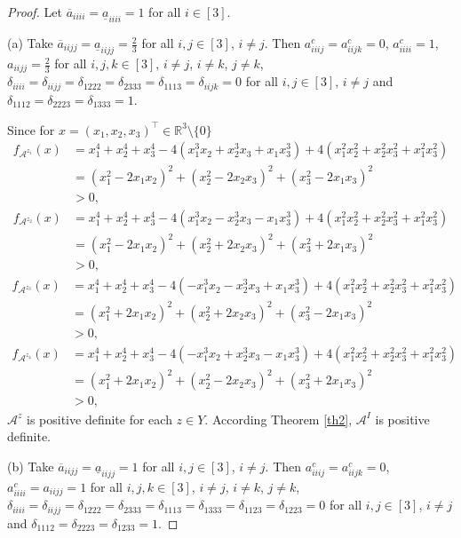 \documentclass[10pt,a4paper]{amsart}
\begin{document}
\begin{proof}
Let $\overline{a}_{iiii}=\underline{a}_{iiii}=1$ for all $i\in[3]$.

(a) Take $\overline{a}_{iijj}=\underline{a}_{iijj}=\frac{2}{3}$ for all $i,j\in[3]$, $i\neq j$.
Then $a^c_{iiij}=a^c_{iijk}=0$, $a^c_{iiii}=1$, $a_{iijj}=\frac{2}{3}$ for all $i,j,k\in[3]$, $i\neq j$, $i\neq k$, $j\neq k$, $\delta_{iiii}=\delta_{iijj}=\delta_{1222}=\delta_{2333}=\delta_{1113}=\delta_{iijk}=0$ for all $i,j\in[3]$, $i\neq j$ and $\delta_{1112}=\delta_{2223}=\delta_{1333}=1$.

Since for $x=(x_1,x_2,x_3)^{\top}\in\mathbb{R}^3\setminus\{0\}$
\begin{align*}
  f_{\mathcal{A}^{z_1}}(x) &=x_1^4+x_2^4+x_3^4-4(x_1^3x_2+x_2^3x_3+x_1x_3^3)+4(x_1^2x_2^2+x_2^2x_3^2+x_1^2x_3^2)\\
  &=(x_1^2-2x_1x_2)^2+(x_2^2-2x_2x_3)^2+(x_3^2-2x_1x_3)^2\\
  &>0,
\end{align*}
\begin{align*}
  f_{\mathcal{A}^{z_2}}(x)&=x_1^4+x_2^4+x_3^4-4(x_1^3x_2-x_2^3x_3-x_1x_3^3)+4(x_1^2x_2^2+x_2^2x_3^2+x_1^2x_3^2)\\
  &=(x_1^2-2x_1x_2)^2+(x_2^2+2x_2x_3)^2+(x_3^2+2x_1x_3)^2\\
  &>0,
\end{align*}
\begin{align*}
  f_{\mathcal{A}^{z_3}}(x)&=x_1^4+x_2^4+x_3^4-4(-x_1^3x_2-x_2^3x_3+x_1x_3^3)+4(x_1^2x_2^2+x_2^2x_3^2+x_1^2x_3^2)\\
  &=(x_1^2+2x_1x_2)^2+(x_2^2+2x_2x_3)^2+(x_3^2-2x_1x_3)^2\\
  &>0,
\end{align*}
\begin{align*}
 f_{\mathcal{A}^{z_4}}(x)&=x_1^4+x_2^4+x_3^4-4(-x_1^3x_2+x_2^3x_3-x_1x_3^3)+4(x_1^2x_2^2+x_2^2x_3^2+x_1^2x_3^2)\\
  &=(x_1^2+2x_1x_2)^2+(x_2^2-2x_2x_3)^2+(x_3^2+2x_1x_3)^2\\
  &>0,
\end{align*}
$\mathcal{A}^z$ is positive definite for each $z\in Y$. According Theorem \ref{th2}, $\mathcal{A}^I$ is positive definite.

(b) Take $\overline{a}_{iijj}=\underline{a}_{iijj}=1$ for all $i,j\in[3]$, $i\neq j$.
Then $a^c_{iiij}=a^c_{iijk}=0$, $a^c_{iiii}=a_{iijj}=1$ for all $i,j,k\in[3]$, $i\neq j$, $i\neq k$, $j\neq k$, $\delta_{iiii}=\delta_{iijj}=\delta_{1222}=\delta_{2333}=\delta_{1113}=\delta_{1333}=\delta_{1123}=\delta_{1223}=0$ for all $i,j\in[3]$, $i\neq j$ and $\delta_{1112}=\delta_{2223}=\delta_{1233}=1$.


\end{proof}
\end{document}
